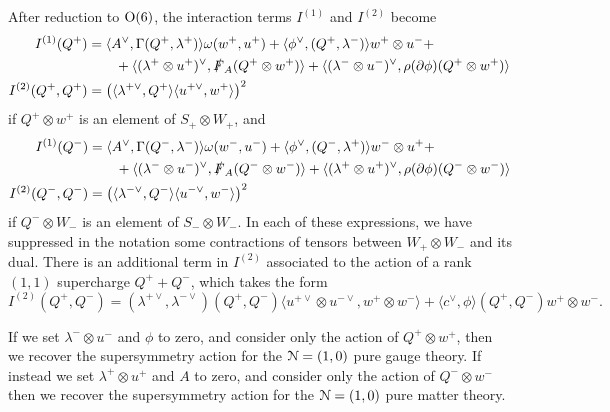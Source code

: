 \documentclass[10pt, oneside]{article}
\begin{document}
\begin{prop} \label{O6_decomposition_of_susy_prop}
After reduction to $\mathrm{O}(6)$, the interaction terms $I^{(1)}$ and $I^{(2)}$ become
\begin{align*}
I^{(1)}(Q^+) &= \langle A^\vee, \Gamma(Q^+, \lambda^+)\rangle\omega(w^+,u^+) + \langle \phi^\vee, (Q^+,\lambda^-)\rangle w^+ \otimes u^- + \\&\qquad + \langle (\lambda^{+} \otimes u^+)^\vee, \slashed{F}_A (Q^+ \otimes w^+) \rangle + \langle (\lambda^{-} \otimes u^-)^\vee, \rho(\partial \phi)(Q^+ \otimes w^+) \rangle\\
I^{(2)}(Q^+, Q^+) &= \left(\langle\lambda^{+\vee},Q^+\rangle\langle u^{+\vee}, w^+ \rangle\right)^2
\end{align*}
if $Q^+ \otimes w^+$ is an element of $S_+ \otimes W_+$, and
\begin{align*}
I^{(1)}(Q^-) &= \langle A^\vee, \Gamma(Q^-, \lambda^-)\rangle\omega(w^-,u^-) + \langle \phi^\vee, (Q^-,\lambda^+)\rangle w^- \otimes u^+ + \\&\qquad + \langle (\lambda^{-} \otimes u^-)^\vee, \slashed{F}_A (Q^- \otimes w^-) \rangle + \langle (\lambda^{+} \otimes u^+)^\vee, \rho(\partial \phi)(Q^- \otimes w^-) \rangle\\
I^{(2)}(Q^-, Q^-) &= \left(\langle\lambda^{-\vee},Q^-\rangle\langle u^{-\vee}, w^- \rangle\right)^2
\end{align*}
if $Q^- \otimes W_-$ is an element of $S_- \otimes W_-$.  In each of these expressions, we have suppressed in the notation some contractions of tensors between $W_+ \otimes W_-$ and its dual.  There is an additional term in $I^{(2)}$ associated to the action of a rank $(1,1)$ supercharge $Q^+ + Q^-$, which takes the form
\[I^{(2)}(Q^+, Q^-) = (\lambda^{+\vee}, \lambda^{-\vee})(Q^+,Q^-) \langle u^{+\vee} \otimes u^{-\vee}, w^+ \otimes w^-\rangle + \langle c^\vee, \phi \rangle(Q^+,Q^-) w^+ \otimes w^-. \]
\end{prop}

\begin{remark}
If we set $\lambda^- \otimes u^-$ and $\phi$ to zero, and consider only the action of $Q^+ \otimes w^+$, then we recover the supersymmetry action for the $\mathcal{N}=(1,0)$ pure gauge theory.  If instead we set $\lambda^+ \otimes u^+$ and $A$ to zero, and consider only the action of $Q^- \otimes w^-$ then we recover the supersymmetry action for the $\mathcal{N}=(1,0)$ pure matter theory.
\end{remark}

\vspace{-10pt}
\end{document}
